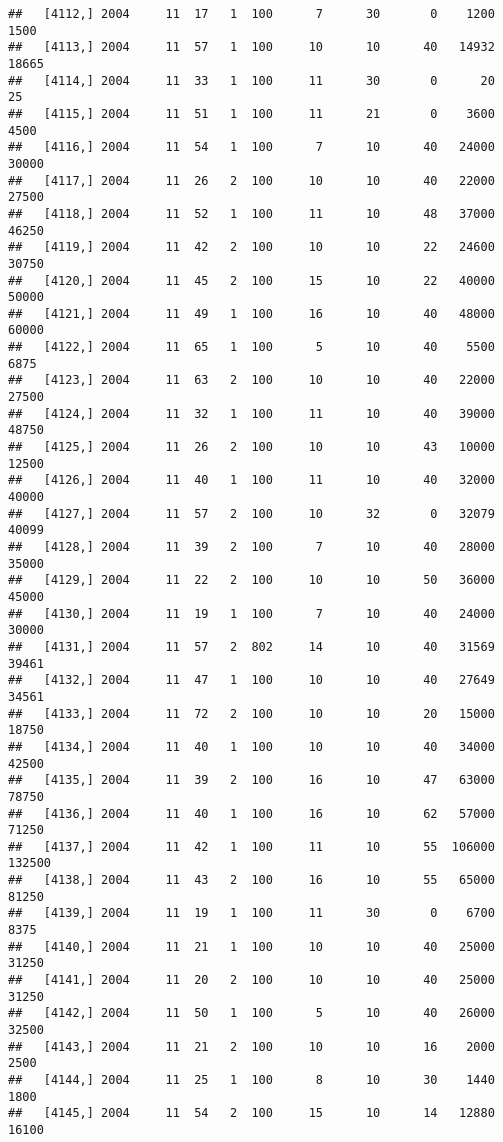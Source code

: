 \documentclass{article}\usepackage[]{graphicx}\usepackage[]{color}
\makeatletter
\newenvironment{kframe}{%
 \def\at@end@of@kframe{}%
 \ifinner\ifhmode%
  \def\at@end@of@kframe{\end{minipage}}%
  \begin{minipage}{\columnwidth}%
 \fi\fi%
 \def\FrameCommand##1{\hskip\@totalleftmargin \hskip-\fboxsep
 \colorbox{shadecolor}{##1}\hskip-\fboxsep
     \hskip-\linewidth \hskip-\@totalleftmargin \hskip\columnwidth}%
 \MakeFramed {\advance\hsize-\width
   \@totalleftmargin\z@ \linewidth\hsize
   \@setminipage}}%
 {\par\unskip\endMakeFramed%
 \at@end@of@kframe}
\newenvironment{knitrout}{}{} %
\makeatother
\begin{document}
\begin{knitrout}
\begin{kframe}
\begin{verbatim}
##   [4112,] 2004     11  17   1  100      7      30       0    1200    1500
##   [4113,] 2004     11  57   1  100     10      10      40   14932   18665
##   [4114,] 2004     11  33   1  100     11      30       0      20      25
##   [4115,] 2004     11  51   1  100     11      21       0    3600    4500
##   [4116,] 2004     11  54   1  100      7      10      40   24000   30000
##   [4117,] 2004     11  26   2  100     10      10      40   22000   27500
##   [4118,] 2004     11  52   1  100     11      10      48   37000   46250
##   [4119,] 2004     11  42   2  100     10      10      22   24600   30750
##   [4120,] 2004     11  45   2  100     15      10      22   40000   50000
##   [4121,] 2004     11  49   1  100     16      10      40   48000   60000
##   [4122,] 2004     11  65   1  100      5      10      40    5500    6875
##   [4123,] 2004     11  63   2  100     10      10      40   22000   27500
##   [4124,] 2004     11  32   1  100     11      10      40   39000   48750
##   [4125,] 2004     11  26   2  100     10      10      43   10000   12500
##   [4126,] 2004     11  40   1  100     11      10      40   32000   40000
##   [4127,] 2004     11  57   2  100     10      32       0   32079   40099
##   [4128,] 2004     11  39   2  100      7      10      40   28000   35000
##   [4129,] 2004     11  22   2  100     10      10      50   36000   45000
##   [4130,] 2004     11  19   1  100      7      10      40   24000   30000
##   [4131,] 2004     11  57   2  802     14      10      40   31569   39461
##   [4132,] 2004     11  47   1  100     10      10      40   27649   34561
##   [4133,] 2004     11  72   2  100     10      10      20   15000   18750
##   [4134,] 2004     11  40   1  100     10      10      40   34000   42500
##   [4135,] 2004     11  39   2  100     16      10      47   63000   78750
##   [4136,] 2004     11  40   1  100     16      10      62   57000   71250
##   [4137,] 2004     11  42   1  100     11      10      55  106000  132500
##   [4138,] 2004     11  43   2  100     16      10      55   65000   81250
##   [4139,] 2004     11  19   1  100     11      30       0    6700    8375
##   [4140,] 2004     11  21   1  100     10      10      40   25000   31250
##   [4141,] 2004     11  20   2  100     10      10      40   25000   31250
##   [4142,] 2004     11  50   1  100      5      10      40   26000   32500
##   [4143,] 2004     11  21   2  100     10      10      16    2000    2500
##   [4144,] 2004     11  25   1  100      8      10      30    1440    1800
##   [4145,] 2004     11  54   2  100     15      10      14   12880   16100

\end{verbatim}
\end{kframe}
\end{knitrout}
\end{document}
